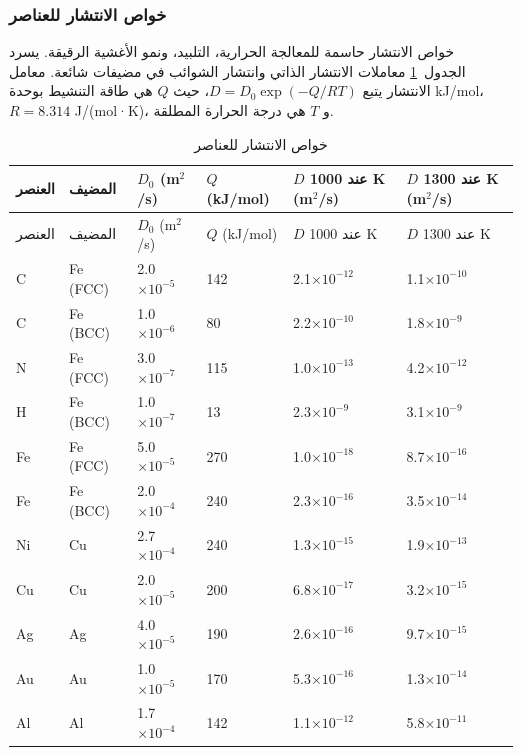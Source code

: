 \documentclass[11pt,a4paper]{article}
\begin{document}
\begin{otherlanguage}{arabic}
		\subsubsection{خواص الانتشار للعناصر}
		\label{subsec:diffusion-properties-func}
		
		خواص الانتشار حاسمة للمعالجة الحرارية، التلبيد، ونمو الأغشية الرقيقة. يسرد الجدول~\ref{tab:diffusion-properties-func} معاملات الانتشار الذاتي وانتشار الشوائب في مضيفات شائعة. معامل الانتشار يتبع \(D = D_0 \exp(-Q/RT)\)، حيث \(Q\) هي طاقة التنشيط بوحدة kJ/mol، \(R = 8.314\) J/(mol·K)، و \(T\) هي درجة الحرارة المطلقة.
		
		\begin{longtable}{p{1.2cm}p{1.2cm}p{2.0cm}p{2.5cm}p{2.5cm}p{2.5cm}}
			\caption{خواص الانتشار للعناصر} \label{tab:diffusion-properties-func} \\
			\toprule
			العنصر & المضيف & \(D_0\) (m\(^2\)/s) & \(Q\) (kJ/mol) & \(D\) عند 1000 K (m\(^2\)/s) & \(D\) عند 1300 K (m\(^2\)/s) \\
			\midrule
			\endfirsthead
			\toprule
			العنصر & المضيف & \(D_0\) (m\(^2\)/s) & \(Q\) (kJ/mol) & \(D\) عند 1000 K & \(D\) عند 1300 K \\
			\midrule
			\endhead
			C & Fe (FCC) & 2.0\(\times10^{-5}\) & 142 & 2.1\(\times10^{-12}\) & 1.1\(\times10^{-10}\) \\
			C & Fe (BCC) & 1.0\(\times10^{-6}\) & 80 & 2.2\(\times10^{-10}\) & 1.8\(\times10^{-9}\) \\
			N & Fe (FCC) & 3.0\(\times10^{-7}\) & 115 & 1.0\(\times10^{-13}\) & 4.2\(\times10^{-12}\) \\
			H & Fe (BCC) & 1.0\(\times10^{-7}\) & 13 & 2.3\(\times10^{-9}\) & 3.1\(\times10^{-9}\) \\
			Fe & Fe (FCC) & 5.0\(\times10^{-5}\) & 270 & 1.0\(\times10^{-18}\) & 8.7\(\times10^{-16}\) \\
			Fe & Fe (BCC) & 2.0\(\times10^{-4}\) & 240 & 2.3\(\times10^{-16}\) & 3.5\(\times10^{-14}\) \\
			Ni & Cu & 2.7\(\times10^{-4}\) & 240 & 1.3\(\times10^{-15}\) & 1.9\(\times10^{-13}\) \\
			Cu & Cu & 2.0\(\times10^{-5}\) & 200 & 6.8\(\times10^{-17}\) & 3.2\(\times10^{-15}\) \\
			Ag & Ag & 4.0\(\times10^{-5}\) & 190 & 2.6\(\times10^{-16}\) & 9.7\(\times10^{-15}\) \\
			Au & Au & 1.0\(\times10^{-5}\) & 170 & 5.3\(\times10^{-16}\) & 1.3\(\times10^{-14}\) \\
			Al & Al & 1.7\(\times10^{-4}\) & 142 & 1.1\(\times10^{-12}\) & 5.8\(\times10^{-11}\) \\

\end{longtable}
\end{otherlanguage}
\end{document}
